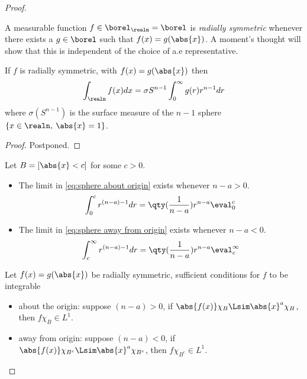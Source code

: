 \documentclass[../main-v2-manifolds.tex]{subfiles}
\begin{document}
\begin{proof}
\begin{note}[Integrability of $C$]\label{note:integrability of C sobolev embedding theorem}
A measurable function $f\in\borel_{\realn}=\borel$ is \emph{radially symmetric} whenever there exists a $g\in\borel$ such that $f(x) = g(\abs{x})$. A moment's thought will show that this is independent of the choice of a.e representative. 
\begin{lemma}
    If $f$ is radially symmetric, with $f(x) = g(\abs{x})$ then
    \begin{equation}
        \int_{\realn}f(x) dx = \sigma{S^{n-1}}\int_0^\infty g(r)r^{n-1}     dr
        \label{eq:polar integration folland 2.51}
    \end{equation}
    where $\sigma(S^{n-1})$ is the surface measure of the $n-1$ sphere $\{x\in\realn,\: \abs{x}=1\}$.
\end{lemma}
\begin{proof}
    Postponed.
\end{proof}
Let $B = [\abs{x}< c]$ for some $c>0$. 
\begin{itemize}
    \item The limit in \cref{eq:sphere about origin} exists whenever $n-a>0$.
    \begin{equation}
        \int_0^c r^{(n-a)-1}dr =\qty(\frac{1}{n-a})r^{n-a}\eval^{c}_0
        \label{eq:sphere about origin}
    \end{equation}
    \item The limit in \cref{eq:sphere away from origin} exists whenever $n-a<0$.
    \begin{equation}
        \int_c^\infty r^{(n-a)-1}dr = \qty(\frac{1}{n-a})r^{n-a}\eval^{\infty}_{c}
        \label{eq:sphere away from origin}
    \end{equation}
\end{itemize}
\begin{lemma}
    Let $f(x) = g(\abs{x})$ be radially symmetric, sufficient conditions for $f$ to be integrable
    \begin{itemize}
        \item about the origin: suppose $(n-a)>0$, if $\abs{f(x)}\chi_B\Lsim \abs{x}^{a}\chi_B$, then $f\chi_B\in L^1$.
        \item away from origin: suppose $(n-a)<0$, if $\abs{f(x)}\chi_{B^c}\Lsim\abs{x}^{a}\chi_{B^c}$, then $f\chi_{B^c}\in L^1$.
    \end{itemize}
\end{lemma}

\end{note}
\end{proof}
\end{document}
